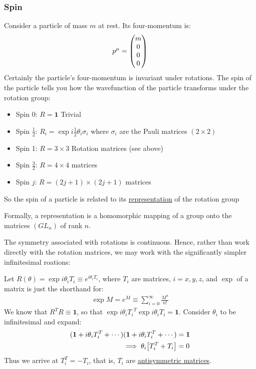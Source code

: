 \subsubsection{Spin}
Consider a particle of mass $m$ at rest. Its four-momentum is:
\begin{align*}
  p^\mu=\pmqty{m\\0\\0\\0}
\end{align*}
Certainly the particle's four-momentum is invariant under rotations. The spin of the particle tells you how the wavefunction of the particle transforms  under the rotation group:
\begin{itemize}
\item Spin 0: $R=\bm{1}$ Trivial
\item Spin $\frac12$: $R_i=\exp{i\frac12\theta_i\sigma_i}$ where $\sigma_i$ are the Pauli matrices $(2\times2)$
\item Spin 1: $R=3\times3$ Rotation matrices (see above)
\item Spin $\frac32$: $R=4\times4$ matrices
\item Spin $j$: $R=(2j+1)\times(2j+1)$ matrices
\end{itemize}
So the spin of a particle is related to its \underline{representation} of the rotation group

Formally, a representation is a homomorphic mapping of a group onto the matrices $(GL_n)$ of rank $n$.

The symmetry associated with rotations is continuous. Hence, rather than work directly with the rotation matrices, we may work with the significantly simpler infinitesimal roations:

Let $R(\theta)=\exp{i\theta_iT_i}\equiv e^{i\theta_iT_i}$, where $T_i$ are matrices, $i=x,y,z$, and $\exp$ of a matrix is just the shorthand for:
\begin{align*}
  \exp{M}=e^M\equiv\sum_{i=0}^\infty\frac{M^n}{n!}
\end{align*}
We know that $R^TR\equiv\bm{1}$, so that $\exp{i\theta_iT_i}^T\exp{i\theta_iT_i}=\bm{1}$. Consider $\theta_i$ to be infinitesimal and expand:
\begin{align*}
  (\bm{1}+i\theta_iT_i^T+\cdots)
  (\bm{1}+i\theta_iT_i^T+\cdots)&=\bm{1}\\
  \implies \theta_i\qty[T_i^T+T_i]&=0
\end{align*}
Thus we arrive at $T_i^T=-T_i$, that is, $T_i$ are \underline{antisymmetric matrices}.

